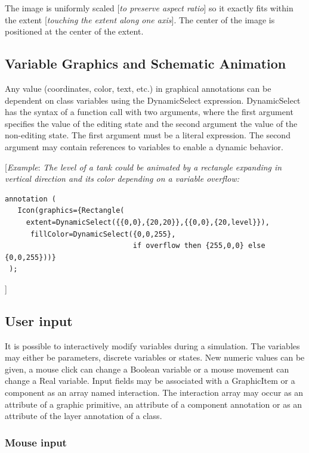 \documentclass[10pt,a4paper]{report}
\def\doublelabel#1{\label{#1}}
\begin{document}
The image is uniformly scaled {[}\emph{to preserve aspect ratio}{]} so
it exactly fits within the extent {[}\emph{touching the extent along one
axis}{]}. The center of the image is positioned at the center of the
extent.

\subsection{Variable Graphics and Schematic Animation}\doublelabel{variable-graphics-and-schematic-animation}

Any value (coordinates, color, text, etc.) in graphical annotations can
be dependent on class variables using the DynamicSelect expression.
DynamicSelect has the syntax of a function call with two arguments,
where the first argument specifies the value of the editing state and
the second argument the value of the non-editing state. The first
argument must be a literal expression. The second argument may contain
references to variables to enable a dynamic behavior.

{[}\emph{Example}: \emph{The level of a tank could be animated by a
rectangle expanding in vertical direction and its color depending on a
variable overflow:}
\begin{lstlisting}[language=modelica]
  annotation (
   Icon(graphics={Rectangle(
     extent=DynamicSelect({{0,0},{20,20}},{{0,0},{20,level}}),
      fillColor=DynamicSelect({0,0,255},
                              if overflow then {255,0,0} else {0,0,255}))}
 );
\end{lstlisting}
{]}

\subsection{User input}\doublelabel{user-input}

It is possible to interactively modify variables during a simulation.
The variables may either be parameters, discrete variables or states.
New numeric values can be given, a mouse click can change a Boolean
variable or a mouse movement can change a Real variable. Input fields
may be associated with a GraphicItem or a component as an array named
interaction. The interaction array may occur as an attribute of a
graphic primitive, an attribute of a component annotation or as an
attribute of the layer annotation of a class.

\subsubsection{Mouse input}\doublelabel{mouse-input}
\end{document}
